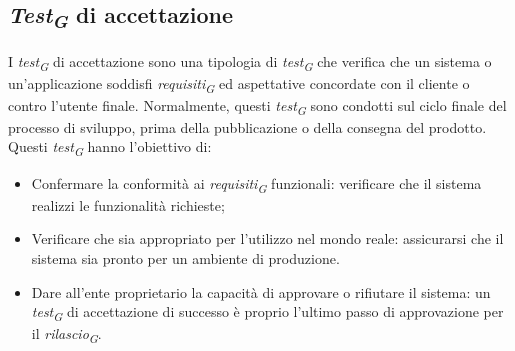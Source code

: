 \subsection{\textit{Test\textsubscript{G}} di accettazione}
I \textit{test\textsubscript{G}} di accettazione sono una tipologia di \textit{test\textsubscript{G}} che verifica che un sistema o un'applicazione soddisfi \textit{requisiti\textsubscript{G}} ed aspettative concordate con il cliente o contro l'utente finale. Normalmente, questi \textit{test\textsubscript{G}} sono condotti sul ciclo finale del processo di sviluppo, prima della pubblicazione o della consegna del prodotto. Questi \textit{test\textsubscript{G}} hanno l'obiettivo di:
\begin{itemize}
    \item Confermare la conformità ai \textit{requisiti\textsubscript{G}} funzionali: verificare che il sistema realizzi le funzionalità richieste;
    \item Verificare che sia appropriato per l'utilizzo nel mondo reale: assicurarsi che il sistema sia pronto per un ambiente di produzione.
    \item Dare all'ente proprietario la capacità di approvare o rifiutare il sistema: un \textit{test\textsubscript{G}} di accettazione di successo è proprio l'ultimo passo di approvazione per il \textit{rilascio\textsubscript{G}}.
\end{itemize}
